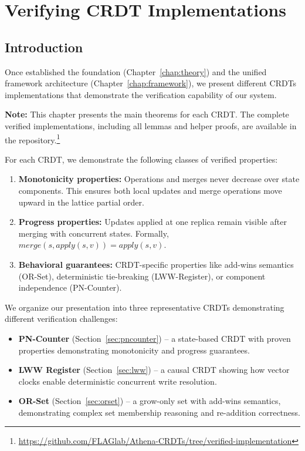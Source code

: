 
\chapter{Verifying CRDT Implementations}\label{chap:implementations}

\section{Introduction}

Once established the foundation (Chapter~\ref{chap:theory}) and the unified framework architecture (Chapter~\ref{chap:framework}), we present different CRDTs implementations that demonstrate the verification capability of our system.

\textbf{Note:} This chapter presents the main theorems for each CRDT. The complete verified implementations, including all lemmas and helper proofs, are available in the repository.\footnote{\url{https://github.com/FLAGlab/Athena-CRDTs/tree/verified-implementation}}

For each CRDT, we demonstrate the following classes of verified properties:

\begin{enumerate}
  \item \textbf{Monotonicity properties:} Operations and merges never decrease over state components. This ensures both local updates and merge operations move upward in the lattice partial order.
    
    \item \textbf{Progress properties:} Updates applied at one replica remain visible after merging with concurrent states. Formally, $\mathit{merge}(s, \mathit{apply}(s, v)) = \mathit{apply}(s, v)$.
    
    \item \textbf{Behavioral guarantees:} CRDT-specific properties like add-wins semantics (OR-Set), deterministic tie-breaking (LWW-Register), or component independence (PN-Counter).
\end{enumerate}

We organize our presentation into three representative CRDTs demonstrating different verification challenges:
\begin{itemize}
  \item \textbf{PN-Counter} (Section~\ref{sec:pncounter}) -- a state-based CRDT with proven properties demonstrating monotonicity and progress guarantees.
  \item \textbf{LWW Register} (Section~\ref{sec:lww}) -- a causal CRDT showing how vector clocks enable deterministic concurrent write resolution.
  \item \textbf{OR-Set} (Section~\ref{sec:orset}) -- a grow-only set with add-wins semantics, demonstrating complex set membership reasoning and re-addition correctness.
\end{itemize}

